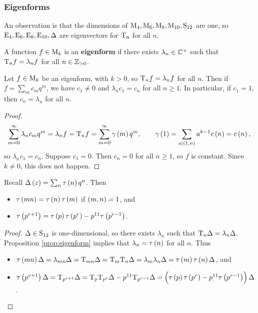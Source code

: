 \pagebreak

\subsubsection{Eigenforms}

An observation is that the dimensions of $ \M_4, \M_6, \M_8, \M_{10}, \S_{12} $ are one, so $ \E_4, \E_6, \E_8, \E_{10}, \Delta $ are eigenvectors for $ \T_n $ for all $ n $.

\begin{definition}
A function $ f \in \M_k $ is an \textbf{eigenform} if there exists $ \lambda_n \in \CC^\times $ such that $ \T_nf = \lambda_nf $ for all $ n \in \ZZ_{> 0} $.
\end{definition}


\begin{proposition}
\label{prop:eigenform}
Let $ f \in \M_k $ be an eigenform, with $ k > 0 $, so $ \T_nf = \lambda_nf $ for all $ n $. Then if $ f = \sum_m c_mq^m $, we have $ c_1 \ne 0 $ and $ \lambda_nc_1 = c_n $ for all $ n \ge 1 $. In particular, if $ c_1 = 1 $, then $ c_n = \lambda_n $ for all $ n $.
\end{proposition}

\begin{proof}
$$ \sum_{m = 0}^\infty \lambda_nc_mq^m = \lambda_nf = \T_nf = \sum_{m = 0}^\infty \gamma\br{m}q^m, \qquad \gamma\br{1} = \sum_{a \mid \br{1, n}} a^{k - 1}c\br{n} = c\br{n}, $$
so $ \lambda_nc_1 = c_n $. Suppose $ c_1 = 0 $. Then $ c_n = 0 $ for all $ n \ge 1 $, so $ f $ is constant. Since $ k \ne 0 $, this does not happen.
\end{proof}

\begin{corollary}
Recall $ \Delta\br{z} = \sum_n \tau\br{n}q^n $. Then
\begin{itemize}
\item $ \tau\br{mn} = \tau\br{n}\tau\br{m} $ if $ \br{m, n} = 1 $, and
\item $ \tau\br{p^{r + 1}} = \tau\br{p}\tau\br{p^r} - p^{11}\tau\br{p^{r - 1}} $.
\end{itemize}
\end{corollary}

\begin{proof}
$ \Delta \in \S_{12} $ is one-dimensional, so there exists $ \lambda_n $ such that $ \T_n\Delta = \lambda_n\Delta $. Proposition \ref{prop:eigenform} implies that $ \lambda_n = \tau\br{n} $ for all $ n $. Thus
\begin{itemize}
\item $ \tau\br{mn}\Delta = \lambda_{mn}\Delta = \T_{mn}\Delta = \T_m\T_n\Delta = \lambda_m\lambda_n\Delta = \tau\br{m}\tau\br{n}\Delta $, and
\item $ \tau\br{p^{r + 1}}\Delta = \T_{p^{r + 1}}\Delta = \T_p\T_{p^r}\Delta - p^{11}\T_{p^{r - 1}}\Delta = \br{\tau\br{p}\tau\br{p^r} - p^{11}\tau\br{p^{r - 1}}}\Delta $.
\end{itemize}
\end{proof}

